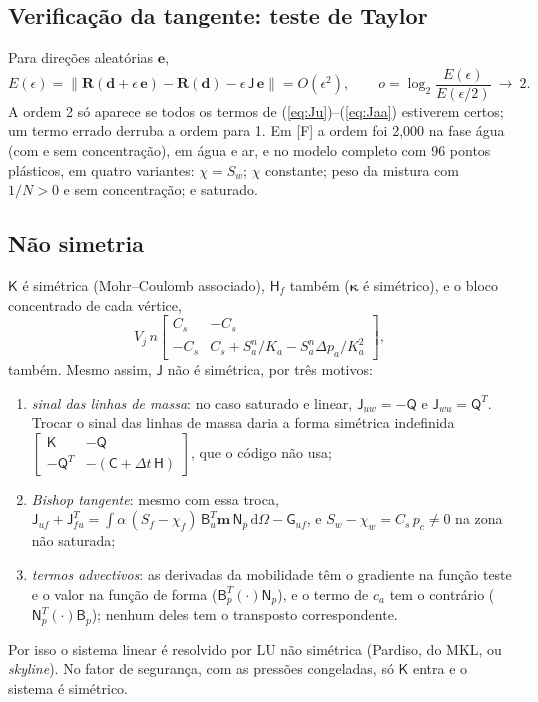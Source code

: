 \documentclass[11pt,a4paper]{article}
\newcommand{\tkap}{\bm\kappa}
\newcommand{\mt}[1]{\mathsf{#1}}
\newcommand{\dd}{\mathrm d}
\begin{document}
\subsection{Verificação da tangente: teste de Taylor}
Para direções aleatórias $\mathbf e$,
\begin{equation}
E(\epsilon)=\big\|\mathbf R(\mathbf d+\epsilon\,\mathbf e)-\mathbf R(\mathbf d)
-\epsilon\,\mt J\,\mathbf e\big\|=O(\epsilon^2),\qquad
o=\log_2\frac{E(\epsilon)}{E(\epsilon/2)}\ \to\ 2 .
\label{eq:taylor}
\end{equation}
A ordem 2 só aparece se todos os termos de (\ref{eq:Ju})--(\ref{eq:Jaa}) estiverem certos;
um termo errado derruba a ordem para 1. Em [F] a ordem foi 2,000 na fase água (com e sem
concentração), em água e ar, e no modelo completo com 96 pontos plásticos, em quatro
variantes: $\chi=S_w$; $\chi$ constante; peso da mistura com $1/N>0$ e sem concentração; e
saturado.

\subsection{Não simetria}
$\mt K$ é simétrica (Mohr--Coulomb associado), $\mt H_f$ também ($\tkap$ é simétrico), e o
bloco concentrado de cada vértice,
\[
V_j\,n\begin{bmatrix}C_s&-C_s\\-C_s&C_s+S_a^n/K_a-S_a^n\Delta p_a/K_a^2\end{bmatrix},
\]
também. Mesmo assim, $\mt J$ não é simétrica, por três motivos:
\begin{enumerate}[label=(\roman*),leftmargin=*]
\item \emph{sinal das linhas de massa}: no caso saturado e linear, $\mt J_{uw}=-\mt Q$ e
  $\mt J_{wu}=\mt Q^T$. Trocar o sinal das linhas de massa daria a forma simétrica
  indefinida
  $\left[\begin{smallmatrix}\mt K&-\mt Q\\-\mt Q^T&-(\mt C+\Delta t\,\mt H)\end{smallmatrix}\right]$,
  que o código não usa;
\item \emph{Bishop tangente}: mesmo com essa troca,
  $\mt J_{uf}+\mt J_{fu}^T=\int\alpha\,(S_f-\chi_f)\,\mt B_u^T\bm m\,\mt N_p\,\dd\Omega-\mt G_{uf}$,
  e $S_w-\chi_w=C_s\,p_c\neq0$ na zona não saturada;
\item \emph{termos advectivos}: as derivadas da mobilidade têm o gradiente na função teste e o
  valor na função de forma ($\mt B_p^T(\cdot)\mt N_p$), e o termo de $c_a$ tem o contrário
  ($\mt N_p^T(\cdot)\mt B_p$); nenhum deles tem o transposto correspondente.
\end{enumerate}
Por isso o sistema linear é resolvido por LU não simétrica (Pardiso, do MKL, ou
\emph{skyline}). No fator de segurança, com as pressões congeladas, só $\mt K$ entra e o
sistema é simétrico.
\end{document}
